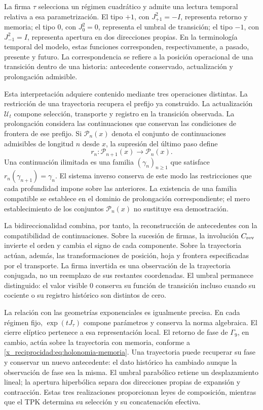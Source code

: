 La firma \(\tau\) selecciona un régimen cuadrático y admite una lectura
temporal relativa a esa parametrización. El tipo \(+1\), con
\(J_{+1}^{2}=-I\), representa retorno y memoria; el tipo \(0\), con
\(J_0^{2}=0\), representa el umbral de transición; el tipo \(-1\), con
\(J_{-1}^{2}=I\), representa apertura en dos direcciones propias. En la
terminología temporal del modelo, estas funciones corresponden,
respectivamente, a pasado, presente y futuro. La correspondencia se refiere
a la posición operacional de una transición dentro de una historia:
antecedente conservado, actualización y prolongación admisible.

Esta interpretación adquiere contenido mediante tres operaciones distintas.
La restricción de una trayectoria recupera el prefijo ya construido. La
actualización \(\mathcal U_t\) compone selección, transporte y registro en
la transición observada. La prolongación considera las continuaciones que
conservan las condiciones de frontera de ese prefijo. Si
\(\mathcal P_n(x)\) denota el conjunto de continuaciones admisibles de
longitud \(n\) desde \(x\), la supresión del último paso define
\[
 r_n:\mathcal P_{n+1}(x)\longrightarrow\mathcal P_n(x).
\]
Una continuación ilimitada es una familia \((\gamma_n)_{n\geq1}\) que
satisface \(r_n(\gamma_{n+1})=\gamma_n\). El sistema inverso conserva de
este modo las restricciones que cada profundidad impone sobre las
anteriores. La existencia de una familia compatible se establece en el
dominio de prolongación correspondiente; el mero establecimiento de los
conjuntos \(\mathcal P_n(x)\) no sustituye esa demostración.

La bidireccionalidad combina, por tanto, la reconstrucción de antecedentes
con la compatibilidad de continuaciones. Sobre la sucesión de firmas, la
involución \(C_{\rm rev}\) invierte el orden y cambia el signo de cada
componente. Sobre la trayectoria actúan, además, las transformaciones de
posición, hoja y frontera especificadas por el transporte. La firma
invertida es una observación de la trayectoria conjugada, no un reemplazo
de sus restantes coordenadas. El umbral permanece distinguido: el valor
visible \(0\) conserva su función de transición incluso cuando su cociente
o su registro histórico son distintos de cero.

La relación con las geometrías exponenciales es igualmente precisa. En
cada régimen fijo, \(\exp(tJ_\tau)\) compone parámetros y conserva la
norma algebraica. El cierre elíptico pertenece a esa representación local.
El retorno de fase de \(\Gamma_9\), en cambio, actúa sobre la trayectoria
con memoria, conforme a \eqref{x_reciprocidad:eq:holonomia-memoria}. Una trayectoria puede
recuperar su fase y conservar un nuevo antecedente: el dato histórico ha
cambiado aunque la observación de fase sea la misma. El umbral parabólico
retiene un desplazamiento lineal; la apertura hiperbólica separa dos
direcciones propias de expansión y contracción. Estas tres realizaciones
proporcionan leyes de composición, mientras que el TPK determina su
selección y su concatenación efectiva.

